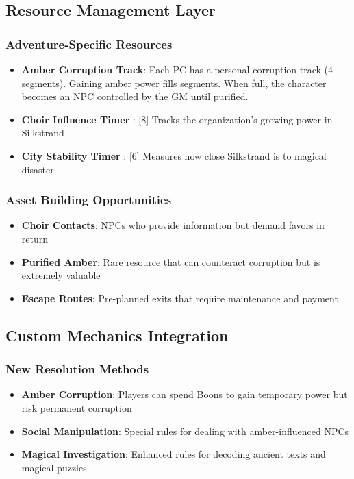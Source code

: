 \documentclass[11pt]{article}
\begin{document}
\subsection*{Resource Management Layer}

\subsubsection*{Adventure-Specific Resources}

\begin{itemize}
  \item \textbf{Amber Corruption Track}: Each PC has a personal corruption track (4 segments). Gaining amber power fills segments. When full, the character becomes an NPC controlled by the GM until purified.
  \item \textbf{Choir Influence Timer }: [8] Tracks the organization's growing power in Silkstrand
  \item \textbf{City Stability Timer }: [6] Measures how close Silkstrand is to magical disaster
\end{itemize}

\subsubsection*{Asset Building Opportunities}

\begin{itemize}
  \item \textbf{Choir Contacts}: NPCs who provide information but demand favors in return
  \item \textbf{Purified Amber}: Rare resource that can counteract corruption but is extremely valuable
  \item \textbf{Escape Routes}: Pre-planned exits that require maintenance and payment
\end{itemize}

\subsection*{Custom Mechanics Integration}

\subsubsection*{New Resolution Methods}

\begin{itemize}
  \item \textbf{Amber Corruption}: Players can spend Boons to gain temporary power but risk permanent corruption
  \item \textbf{Social Manipulation}: Special rules for dealing with amber-influenced NPCs
  \item \textbf{Magical Investigation}: Enhanced rules for decoding ancient texts and magical puzzles
\end{itemize}
\end{document}
